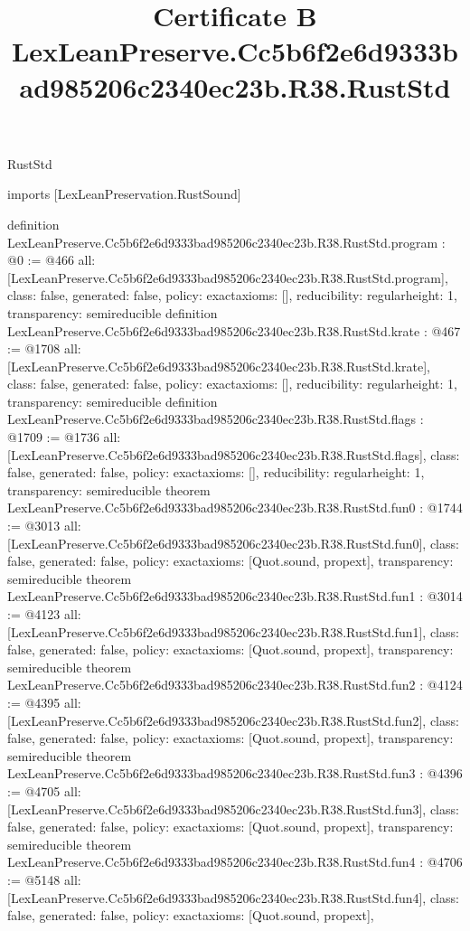 \begin{lexlean}{RustStd}
\title{Certificate B LexLeanPreserve.Cc5b6f2e6d9333bad985206c2340ec23b.R38.RustStd}
\begin{coremodule}
imports [LexLeanPreservation.RustSound]

definition LexLeanPreserve.Cc5b6f2e6d9333bad985206c2340ec23b.R38.RustStd.program : @0 := @466 {
  all: [LexLeanPreserve.Cc5b6f2e6d9333bad985206c2340ec23b.R38.RustStd.program],
  class: false,
  generated: false,
  policy: exact{axioms: []},
  reducibility: regular{height: 1},
  transparency: semireducible
}
definition LexLeanPreserve.Cc5b6f2e6d9333bad985206c2340ec23b.R38.RustStd.krate : @467 := @1708 {
  all: [LexLeanPreserve.Cc5b6f2e6d9333bad985206c2340ec23b.R38.RustStd.krate],
  class: false,
  generated: false,
  policy: exact{axioms: []},
  reducibility: regular{height: 1},
  transparency: semireducible
}
definition LexLeanPreserve.Cc5b6f2e6d9333bad985206c2340ec23b.R38.RustStd.flags : @1709 := @1736 {
  all: [LexLeanPreserve.Cc5b6f2e6d9333bad985206c2340ec23b.R38.RustStd.flags],
  class: false,
  generated: false,
  policy: exact{axioms: []},
  reducibility: regular{height: 1},
  transparency: semireducible
}
theorem LexLeanPreserve.Cc5b6f2e6d9333bad985206c2340ec23b.R38.RustStd.fun0 : @1744 := @3013 {
  all: [LexLeanPreserve.Cc5b6f2e6d9333bad985206c2340ec23b.R38.RustStd.fun0],
  class: false,
  generated: false,
  policy: exact{axioms: [Quot.sound, propext]},
  transparency: semireducible
}
theorem LexLeanPreserve.Cc5b6f2e6d9333bad985206c2340ec23b.R38.RustStd.fun1 : @3014 := @4123 {
  all: [LexLeanPreserve.Cc5b6f2e6d9333bad985206c2340ec23b.R38.RustStd.fun1],
  class: false,
  generated: false,
  policy: exact{axioms: [Quot.sound, propext]},
  transparency: semireducible
}
theorem LexLeanPreserve.Cc5b6f2e6d9333bad985206c2340ec23b.R38.RustStd.fun2 : @4124 := @4395 {
  all: [LexLeanPreserve.Cc5b6f2e6d9333bad985206c2340ec23b.R38.RustStd.fun2],
  class: false,
  generated: false,
  policy: exact{axioms: [Quot.sound, propext]},
  transparency: semireducible
}
theorem LexLeanPreserve.Cc5b6f2e6d9333bad985206c2340ec23b.R38.RustStd.fun3 : @4396 := @4705 {
  all: [LexLeanPreserve.Cc5b6f2e6d9333bad985206c2340ec23b.R38.RustStd.fun3],
  class: false,
  generated: false,
  policy: exact{axioms: [Quot.sound, propext]},
  transparency: semireducible
}
theorem LexLeanPreserve.Cc5b6f2e6d9333bad985206c2340ec23b.R38.RustStd.fun4 : @4706 := @5148 {
  all: [LexLeanPreserve.Cc5b6f2e6d9333bad985206c2340ec23b.R38.RustStd.fun4],
  class: false,
  generated: false,
  policy: exact{axioms: [Quot.sound, propext]},
}
\end{coremodule}
\end{lexlean}
